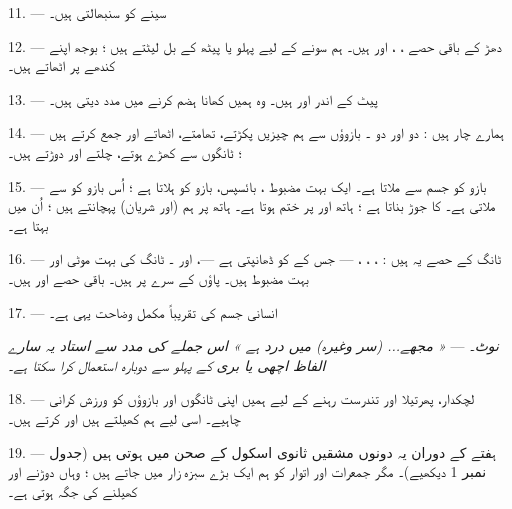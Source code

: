 11. ---  سینے کو سنبھالتی ہیں۔

12. --- دھڑ کے باقی حصے ، ، 
اور  ہیں۔ ہم سونے کے لیے پہلو یا پیٹھ کے بل لیٹتے ہیں ؛
بوجھ اپنے کندھے پر اٹھاتے ہیں۔

13. --- پیٹ کے اندر  اور  ہیں۔ وہ ہمیں
کھانا ہضم کرنے میں مدد دیتی ہیں۔

\VUsaut{4.4mm}
\VUsaut{3.0mm}

14. --- ہمارے چار  ہیں : دو  اور دو
۔ بازوؤں سے ہم چیزیں پکڑتے، تھامتے، اٹھاتے اور جمع
کرتے ہیں ؛ ٹانگوں سے کھڑے ہوتے، چلتے اور دوڑتے ہیں۔

15. ---  بازو کو جسم سے ملاتا ہے۔ ایک بہت مضبوط
، بائسپس، بازو کو ہلاتا ہے ؛ اُس بازو کو 
 سے ملاتی ہے۔ 
 کا جوڑ بناتا ہے ؛ ہاتھ  اور
 پر ختم ہوتا ہے۔ ہاتھ پر ہم  (اور شریان)
پہچانتے ہیں ؛ اُن میں  بہتا ہے۔

16. --- ٹانگ کے حصے یہ ہیں : ، ،
،  — جس کے  کو
 ڈھانپتی ہے —،  اور ۔ ٹانگ کی
 بہت موٹی اور بہت مضبوط ہیں۔ پاؤں کے سرے پر
 ہیں۔ باقی حصے  اور
 ہیں۔

17. --- انسانی جسم کی تقریباً مکمل وضاحت یہی ہے۔

\textit{نوٹ۔} --- \textit{« مجھے... (سر وغیرہ) میں درد ہے » اس}
\textit{جملے کی مدد سے استاد یہ سارے الفاظ اچھی یا بری}
 \textit{کے پہلو سے دوبارہ استعمال کرا سکتا ہے۔}

\VUsaut{5.0mm}
\VUsaut{2.4mm}
\VUsaut{3.0mm}

18. --- لچکدار، پھرتیلا اور تندرست رہنے کے لیے ہمیں اپنی ٹانگوں اور
بازوؤں کو ورزش کرانی چاہیے۔ اسی لیے ہم کھیلتے ہیں اور 
کرتے ہیں۔

19. --- ہفتے کے دوران یہ دونوں مشقیں ثانوی اسکول کے صحن میں ہوتی ہیں
(جدول نمبر 1 دیکھیے)۔ مگر جمعرات اور اتوار کو ہم ایک بڑے سبزہ زار
میں جاتے ہیں ؛ وہاں دوڑنے اور کھیلنے کی جگہ ہوتی ہے۔

